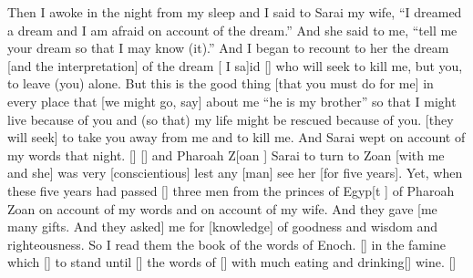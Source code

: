 \begin{translation}
    Then I awoke in the night from my sleep and I said to Sarai my wife, ``I dreamed
    a dream and I am afraid on account of the dream.'' And she said to me, ``tell me your dream so that I may know (it).'' And I began to recount to her the dream 
    [and the interpretation] of the dream [ I sa]id [\hspace*{1em}] who will seek to kill me, but you, to leave (you) alone. But this is the good thing 
    [that you must do for me] in every place that [we might go, say] about me ``he is my brother'' so that I might live because of you and (so that) my life might be rescued because of you. 
    [they will seek] to take you away from me and to kill me. And Sarai wept on account of my words that night.
    [\hspace*{1em}] [\hspace*{1em}] and Pharoah Z[oan ] Sarai to turn to Zoan
    [with me and she] was very [conscientious] lest any [man] see her [for five years]. Yet, when these five years had passed
    [\hspace*{1em}] three men from the princes of Egyp[t ] of Pharoah Zoan on account of my words and on account of my wife. And they gave
    [me many gifts. And they asked] me for [knowledge] of goodness and wisdom and righteousness. So I read them the book of the words of Enoch.
    [\hspace*{1em}] in the famine which [\hspace*{1em}] to stand until [\hspace*{1em}] the words of
    [\hspace*{1em}] with much eating and drinking[\hspace*{1em}] wine.
    [\hspace*{1em}]
\end{translation}